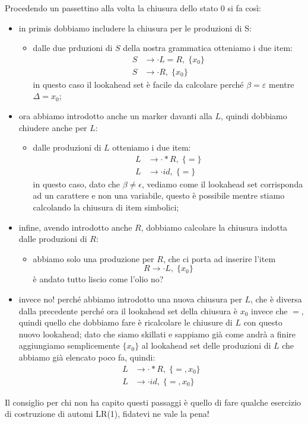 \documentclass[class=book, crop=false, oneside, 12pt]{standalone}
\begin{document}
Procedendo un passettino alla volta la chiusura dello stato 0 si fa così:
\begin{itemize}
    \item in primis dobbiamo includere la chiusura per le produzioni di S:
    \begin{itemize}
        \item dalle due prduzioni di \(S\) della nostra grammatica otteniamo i due item:
        \begin{align*}
            S &\to \cdot L = R,  \; \{x_0\} \\
            S &\to \cdot R,  \; \{x_0\}
        \end{align*}
        in questo caso il lookahead set è facile da calcolare perché \(\beta = \varepsilon\) mentre \(\Delta = x_0\);
    \end{itemize}
    \item ora abbiamo introdotto anche un marker davanti alla \(L\), quindi dobbiamo chiudere anche per \(L\):
    \begin{itemize}
        \item dalle produzioni di \(L\) otteniamo i due item:
        \begin{align*}
            L &\to \cdot *R, \; \{=\} \\
            L &\to \cdot id, \; \{=\}
        \end{align*}
        in questo caso, dato che \(\beta \neq \epsilon\), vediamo come il lookahead set corrisponda ad un carattere e non una variabile, questo è possibile mentre stiamo calcolando la chiusura di item simbolici;
    \end{itemize}
    \item infine, avendo introdotto anche \(R\), dobbiamo calcolare la chiusura indotta dalle produzioni di \(R\):
    \begin{itemize}
        \item abbiamo solo una produzione per \(R\), che ci porta ad inserire l'item 
        \begin{equation*}
            R \to \cdot L, \; \{x_0\}
        \end{equation*}
        è andato tutto liscio come l'olio no?
    \end{itemize}
    \item invece no! perché abbiamo introdotto una nuova chiusura per \(L\), che è diversa dalla precedente perché ora il lookahead set della chiusura è \(x_0\) invece che \(=\), quindi quello che dobbiamo fare è ricalcolare le chiusure di \(L\) con questo nuovo lookahead; dato che siamo skillati e sappiamo già come andrà a finire aggiungiamo semplicemente \(\{x_0\}\) al lookahead set delle produzioni di \(L\) che abbiamo già elencato poco fa, quindi:
    \begin{align*}
        L &\to \cdot *R, \; \{=, x_0\} \\
        L &\to \cdot id, \; \{=, x_0\}
    \end{align*}
\end{itemize}
Il consiglio per chi non ha capito questi passaggi è quello di fare qualche esercizio di costruzione di automi LR(1), fidatevi ne vale la pena!
\end{document}
